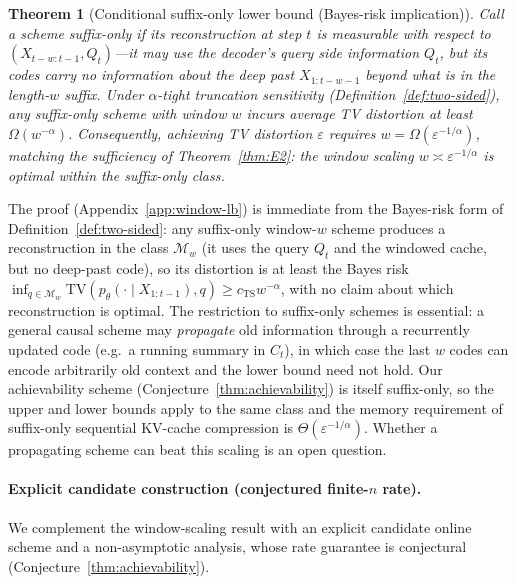 \documentclass[11pt]{article}
\newcommand{\TV}{\mathrm{TV}}
\theoremstyle{plain}
\newtheorem{theorem}{Theorem}[section]
\theoremstyle{definition}
\theoremstyle{remark}
\begin{document}
\begin{theorem}[Conditional suffix-only lower bound (Bayes-risk implication)]
\label{thm:window-lb}
Call a scheme \emph{suffix-only} if its reconstruction at step $t$
is measurable with respect to $(X_{t-w:t-1}, Q_t)$---it may use the
decoder's query side information $Q_t$, but its codes carry no
information about the deep past $X_{1:t-w-1}$ beyond what is in the
length-$w$ suffix. Under
$\alpha$-tight truncation sensitivity
(Definition~\ref{def:two-sided}), any suffix-only scheme with
window $w$ incurs average TV distortion at least
$\Omega(w^{-\alpha})$. Consequently, achieving TV distortion
$\varepsilon$ requires $w = \Omega(\varepsilon^{-1/\alpha})$,
matching the sufficiency of Theorem~\ref{thm:E2}: the window
scaling $w \asymp \varepsilon^{-1/\alpha}$ is optimal within the
suffix-only class.
\end{theorem}

The proof (Appendix~\ref{app:window-lb}) is immediate from the
Bayes-risk form of Definition~\ref{def:two-sided}: any suffix-only
window-$w$ scheme produces a reconstruction in the class
$\mathcal{M}_w$ (it uses the query $Q_t$ and the windowed cache, but
no deep-past code), so its distortion is at least the Bayes risk
$\inf_{q \in \mathcal{M}_w}\TV(p_\theta(\cdot \mid X_{1:t-1}), q)
\geq c_{\mathrm{TS}} w^{-\alpha}$, with no claim about which
reconstruction is optimal. The restriction to suffix-only schemes
is essential: a general causal scheme may \emph{propagate} old
information through a recurrently updated code (e.g.\ a running
summary in $C_t$), in which case the last $w$ codes can encode
arbitrarily old context and the lower bound need not hold. Our
achievability scheme (Conjecture~\ref{thm:achievability}) is itself
suffix-only, so the upper and lower bounds apply to the same class
and the memory requirement of suffix-only sequential KV-cache
compression is $\Theta(\varepsilon^{-1/\alpha})$. Whether a
propagating scheme can beat this scaling is an open question.

\paragraph{Explicit candidate construction (conjectured finite-$n$ rate).}
We complement the window-scaling result with an explicit candidate
online scheme and a non-asymptotic analysis, whose rate guarantee is
conjectural (Conjecture~\ref{thm:achievability}).
\end{document}
